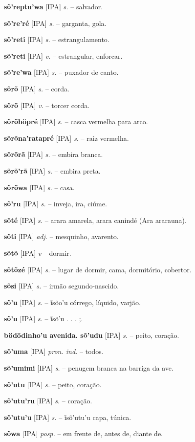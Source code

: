 \textbf{sõ'reptu'wa} [IPA] \textit{s.} -- salvador.

\textbf{sõ're'ré} [IPA] \textit{s.} -- garganta, gola.

\textbf{sõ'reti} [IPA] \textit{s.} -- estrangulamento.

\textbf{sõ'reti} [IPA] \textit{v.} -- estrangular, enforcar.

\textbf{sõ're'wa} [IPA] \textit{s.} -- puxador de canto.

\textbf{sõrõ} [IPA] \textit{s.} -- corda.

\textbf{sõrõ} [IPA] \textit{v.} -- torcer corda.

\textbf{sõrõhöpré} [IPA] \textit{s.} -- casca vermelha para arco.

\textbf{sõrõna'ratapré} [IPA] \textit{s.} -- raiz vermelha.

\textbf{sõrõrã} [IPA] \textit{s.} -- embira branca.

\textbf{sõrõ'rã} [IPA] \textit{s.} -- embira preta.

\textbf{sõrõwa} [IPA] \textit{s.} -- casa.

\textbf{sõ'ru} [IPA] \textit{s.} -- inveja, ira, ciúme.

\textbf{sõté} [IPA] \textit{s.} -- arara amarela, arara canindé (Ara ararauna).

\textbf{sõti} [IPA] \textit{adj.} -- mesquinho, avarento.

\textbf{sõtõ} [IPA] \textit{v} -- dormir.

\textbf{sõtõzé} [IPA] \textit{s.} -- lugar de dormir, cama, dormitório, cobertor.

\textbf{sõsi} [IPA] \textit{s.} -- irmão segundo-nascido.

\textbf{sõ'u} [IPA] \textit{s.} -- ĩsõo'u córrego, líquido, varjão.

\textbf{sõ'u} [IPA] \textit{s.} -- ĩsõ'u . . . ;.

\textbf{bödödinho'u avenida. sõ'udu} [IPA] \textit{s.} -- peito, coração.

\textbf{sõ'uma} [IPA] \textit{pron. ind.} -- todos.

\textbf{sõ'umimi} [IPA] \textit{s.} -- penugem branca na barriga da ave.

\textbf{sõ'utu} [IPA] \textit{s.} -- peito, coração.

\textbf{sõ'utu'ru} [IPA] \textit{s.} -- coração.

\textbf{sõ'utu'u} [IPA] \textit{s.} -- ĩsõ'utu'u capa, túnica.

\textbf{sõwa} [IPA] \textit{posp.} -- em frente de, antes de, diante de.

